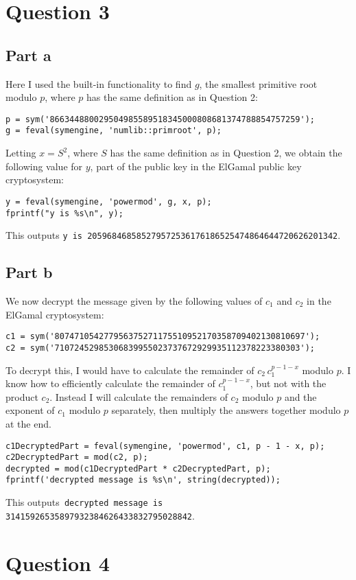 \documentclass[11pt]{article}
\begin{document}
\section*{Question 3}
\subsection*{Part a}
Here I used the built-in functionality to find $g$, the smallest primitive root modulo $p$, where $p$ has the same definition as in Question 2:
\begin{Verbatim}[xleftmargin=0.5in]
p = sym('866344880029504985589518345000808681374788854757259');
g = feval(symengine, 'numlib::primroot', p);
\end{Verbatim}
Letting $x = S^2$, where $S$ has the same definition as in Question 2, we obtain the following value for $y$, part of the public key in the ElGamal public key cryptosystem:
\begin{Verbatim}[xleftmargin=0.5in]
y = feval(symengine, 'powermod', g, x, p);
fprintf("y is %s\n", y);
\end{Verbatim}
This outputs \texttt{y is 205968468585279572536176186525474864644720626201342}.
\subsection*{Part b}
We now decrypt the message given by the following values of $c_1$ and $c_2$ in the ElGamal cryptosystem:
\begin{Verbatim}[xleftmargin=0.5in]
c1 = sym('807471054277956375271175510952170358709402130810697');
c2 = sym('71072452985306839955023737672929935112378223380303');
\end{Verbatim}
To decrypt this, I would have to calculate the remainder of $c_2 \, c_1^{p - 1 - x}$ modulo $p$. I know how to efficiently calculate the remainder of $c_1^{p - 1 - x}$, but not with the product $c_2$. Instead I will calculate the remainders of $c_2$ modulo $p$ and the exponent of $c_1$ modulo $p$ separately, then multiply the answers together modulo $p$ at the end.
\begin{Verbatim}[xleftmargin=0.5in]
c1DecryptedPart = feval(symengine, 'powermod', c1, p - 1 - x, p);
c2DecryptedPart = mod(c2, p);
decrypted = mod(c1DecryptedPart * c2DecryptedPart, p);
fprintf('decrypted message is %s\n', string(decrypted));
\end{Verbatim}
This outputs\texttt{ decrypted message is 31415926535897932384626433832795028842}.
\newpage
\section*{Question 4}
\end{document}
